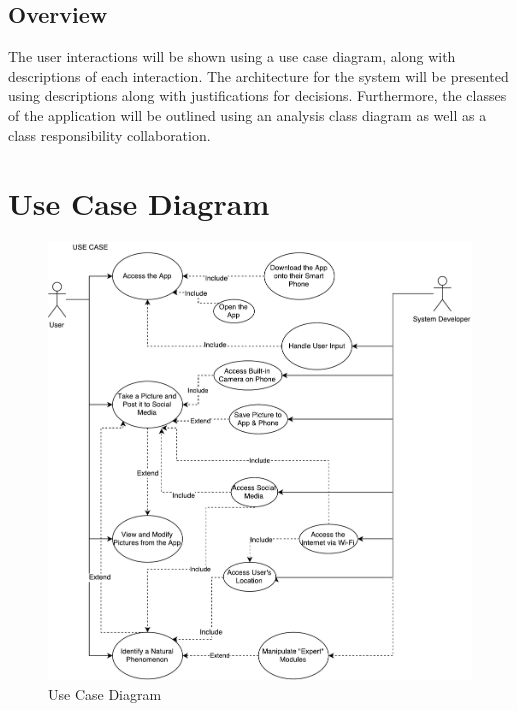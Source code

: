 \documentclass[]{article}
\begin{document}

\subsection{Overview}
\label{sub:overview}
\indent\indent The user interactions will be shown using a use case diagram, along with descriptions of each interaction.  The architecture for the system will be presented using descriptions along with justifications for decisions.  Furthermore, the classes of the application will be outlined using an analysis class diagram as well as a class responsibility collaboration. 


\section{Use Case Diagram}

\begin{figure}[!hb]
	\includegraphics[width=\linewidth]{usecase.pdf}
	\caption{Use Case Diagram}
\end{figure}
\end{document}

